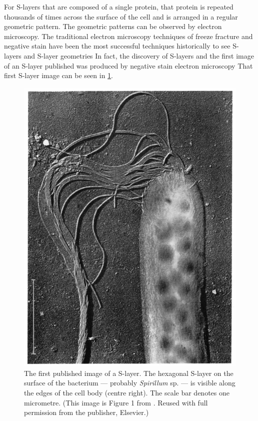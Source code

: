 For \acp{S-layer} that are composed of a single protein, that protein is repeated thousands of times
across the surface of the cell and is arranged in a regular geometric pattern. The geometric
patterns can be observed by electron microscopy. The traditional electron microscopy techniques of freeze fracture and negative stain have been the most successful techniques historically to see \acp{S-layer} and \ac{S-layer} geometries In fact, the discovery of \acp{S-layer} and the first image of an \ac{S-layer} published was produced by negative stain electron microscopy That first \ac{S-layer} image can be seen in \cref{fig:firstslayer}.

\begin{figure}[p] %
  \begin{center}
    \includegraphics{intro/img/firstslayer.pdf}
  \end{center}
  \caption[The first published image of a \ac{S-layer}]{The first published image of a
    \ac{S-layer}. The hexagonal \ac{S-layer} on the surface of the bacterium --- probably
    \textit{Spirillum} sp. --- is visible along the edges of the cell body (centre right). The scale
    bar denotes one micrometre. (This image is Figure 1 from . Reused with
    full permission from the publisher, Elsevier.)}
  \label{fig:firstslayer}
\end{figure} 

